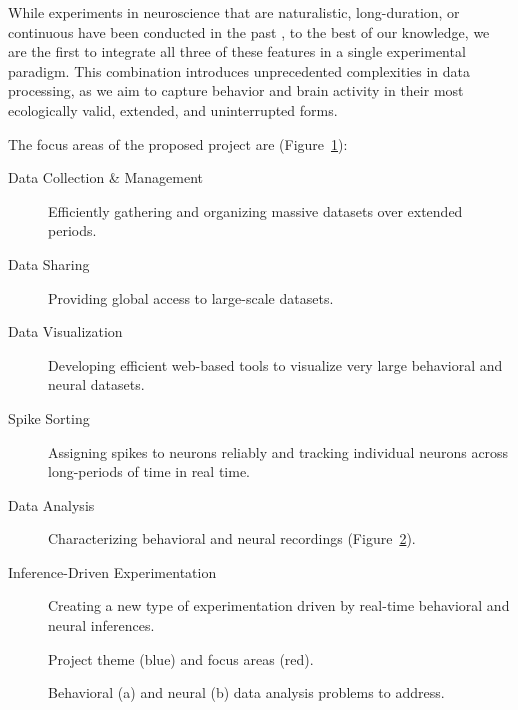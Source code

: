 While experiments in neuroscience that are naturalistic, long-duration, or
continuous have been conducted in the past
\citep[e.g.,][]{jhuangEtAl10,maoEtAl21,volohEtAl23}, to the best of our
knowledge, we are the first to integrate all three of these features in a
single experimental paradigm.
%
This combination introduces unprecedented complexities in data processing, as
we aim to capture behavior and brain activity in their most ecologically valid,
extended, and uninterrupted forms.

The focus areas of the proposed project are (Figure~\ref{fig:focusAreas}):

\begin{description}

    \item[Data Collection \& Management] Efficiently gathering and organizing
        massive datasets over extended periods.

    \item[Data Sharing] Providing global access to large-scale datasets.

    \item[Data Visualization] Developing efficient web-based tools to visualize
        very large behavioral and neural datasets.

    \item[Spike Sorting] Assigning spikes to neurons reliably and tracking
        individual neurons across long-periods of time in real time.

    \item[Data Analysis] Characterizing behavioral and neural recordings
        (Figure~\ref{fig:dataAnalysis}).

    \item[Inference-Driven Experimentation] Creating a new type of
        experimentation driven by real-time behavioral and neural inferences.

\end{description}

\begin{figure}
    \begin{center}
        \resizebox{4.0in}{!}{%
            
        }
    \end{center}
    \caption{Project theme (blue) and focus areas (red).}
    \label{fig:focusAreas}
\end{figure}

\begin{figure}
    \centering
    \subfloat[]{
        \resizebox{3.0in}{!}{%
            
        }
    }
    \hfill
    \subfloat[]{
        \resizebox{2.25in}{!}{%
            
        }
    }
    \caption{Behavioral (a) and neural (b) data analysis problems to address.}
    \label{fig:dataAnalysis}
\end{figure}

